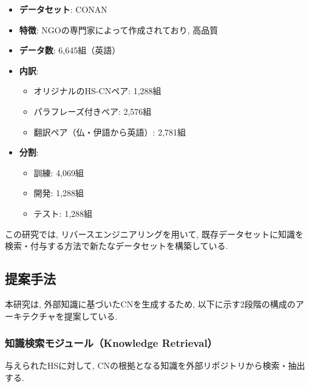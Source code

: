 \documentclass[dvipdfmx]{jsarticle}
\begin{document}
\begin{itemize}
  \item \textbf{データセット}: CONAN
  \item \textbf{特徴}: NGOの専門家によって作成されており, 高品質
  \item \textbf{データ数}: 6,645組（英語）
  \item \textbf{内訳}:
        \begin{itemize}
          \item オリジナルのHS-CNペア: 1,288組
          \item パラフレーズ付きペア: 2,576組
          \item 翻訳ペア（仏・伊語から英語）: 2,781組
        \end{itemize}
  \item \textbf{分割}:
        \begin{itemize}
          \item 訓練: 4,069組
          \item 開発: 1,288組
          \item テスト: 1,288組
        \end{itemize}
\end{itemize}

この研究では, リバースエンジニアリングを用いて, 既存データセットに知識を検索・付与する方法で新たなデータセットを構築している.

\vspace{0.5em}

\subsection{提案手法}

本研究は, 外部知識に基づいたCNを生成するため, 以下に示す2段階の構成のアーキテクチャを提案している.

\subsubsection{知識検索モジュール（Knowledge Retrieval）}

与えられたHSに対して, CNの根拠となる知識を外部リポジトリから検索・抽出する.
\end{document}
